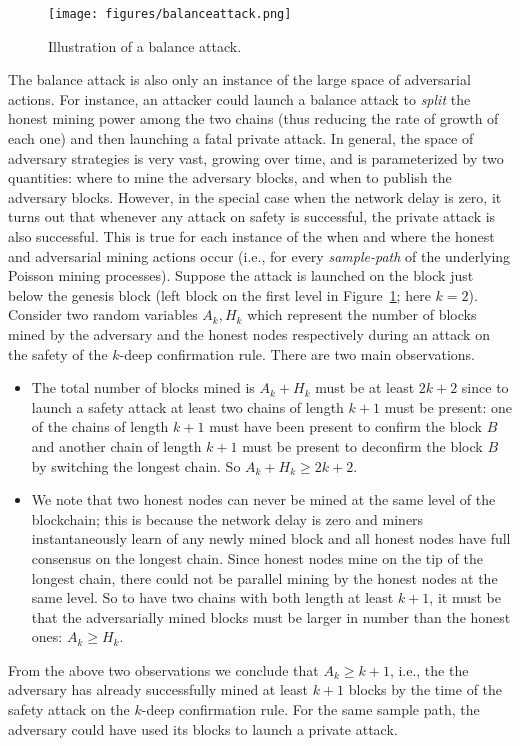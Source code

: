 \documentclass{article}
\begin{document}
\begin{figure}
    \centering
  \texttt{[image: figures/balanceattack.png]}
     \caption{Illustration of a balance attack. }
     \label{fig:balance-attack}
 \end{figure}
 
The balance attack is also only an instance of the large space of adversarial actions. For instance,  an attacker could launch a balance attack to {\em split} the honest mining power among the two chains (thus reducing the rate of growth of each one) and then launching a fatal private attack. In general, the space of adversary strategies is very vast, growing over time, and is parameterized by two quantities: where to mine the adversary blocks, and when to publish the adversary blocks. 
 However,  in the special case when the network delay is zero, it turns out that whenever any attack on safety is successful, the private attack is also successful. This is true for each instance of the when and where the honest and adversarial mining actions occur (i.e., for every {\em sample-path} of the underlying Poisson mining processes). Suppose the attack is launched on the block just below the genesis block (left block on the first level in Figure~\ref{fig:balance-attack}; here $k=2$). Consider two random variables $A_k, H_k$ which represent the number of blocks mined by  the adversary and the honest nodes respectively during an attack on the safety of the $k$-deep confirmation rule. There are two main observations. 
 \begin{itemize}
     \item The total number of blocks  mined is $A_k + H_k$ must be at least $2k+2$ since to launch a safety attack at least two chains of length $k+1$ must be present: one of the chains of length $k+1$ must have been present to confirm the block $B$ and another chain of length $k+1$ must be present to deconfirm the block $B$ by switching the longest chain. So $A_k + H_k \geq 2k+2$. 
     \item We note that two honest nodes can never be mined at the same level of the blockchain; this is because the network delay is zero and miners instantaneously learn of any newly mined block  and all honest nodes have full consensus on the longest chain. Since honest nodes mine on the tip of the longest chain, there could not be parallel mining by the honest nodes at the same level. So to have two chains with both length at least $k+1$, it must be that the adversarially mined blocks must be larger in number than the honest ones: $A_k \geq H_k$.  
  \end{itemize}
  From the above two observations we conclude that $A_k \geq k+1$, i.e., the the adversary has already successfully mined at least $k+1$ blocks by the time of the safety attack on the $k$-deep confirmation rule. For the same sample path, the adversary could have used its blocks to launch a private attack. %
 
\end{document}
